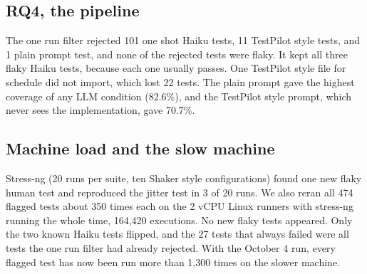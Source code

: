 \documentclass[sigconf,nonacm]{acmart}
\begin{document}
\subsection{RQ4, the pipeline}
The one run filter rejected 101 one shot Haiku tests, 11 TestPilot style tests, and 1 plain prompt test, and none of the rejected tests were flaky. It kept all three flaky Haiku tests, because each one usually passes. One TestPilot style file for schedule did not import, which lost 22 tests. The plain prompt gave the highest coverage of any LLM condition (82.6\%), and the TestPilot style prompt, which never sees the implementation, gave 70.7\%.

\subsection{Machine load and the slow machine}
Stress-ng (20 runs per suite, ten Shaker style configurations) found one new flaky human test and reproduced the jitter test in 3 of 20 runs. We also reran all 474 flagged tests about 350 times each on the 2 vCPU Linux runners with stress-ng running the whole time, 164,420 executions. No new flaky tests appeared. Only the two known Haiku tests flipped, and the 27 tests that always failed were all tests the one run filter had already rejected. With the October 4 run, every flagged test has now been run more than 1,300 times on the slower machine.
\end{document}
